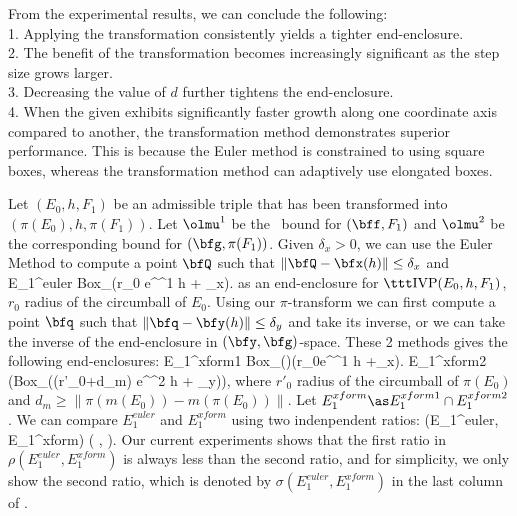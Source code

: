 {	From the experimental results, we can conclude the following:  
	\\ 1. Applying the transformation consistently yields a tighter
	end-enclosure.  
	\\ 2. The benefit of the transformation becomes increasingly
	significant as the step size grows larger.  
	\\ 3. Decreasing the value of $d$ further tightens the end-enclosure.  
	\\ 4. When the given \ivp exhibits significantly faster growth along
	one coordinate axis compared to another, the transformation method
	demonstrates superior performance. This is because the Euler method is
	constrained to using square boxes, whereas the transformation method
	can adaptively use elongated boxes.  


}
		Let $(E_0, h, F_1)$ be an admissible triple
	that has been transformed into $(\pi(E_0),h,\pi(F_1))$.
	Let $\olmu^1$ be the \lognorm\ bound for $(\bff,F_1)$
	and
	$\olmu^2$ be the corresponding bound for $(\bfg,\pi(F_1))$.
	Given $\delta_x>0$, we can use the Euler Method to
	compute a point $\bfQ$ such that 
	$\|\bfQ-\bfx(h)\|\le \delta_x$ and
	E_1^{euler} \as Box_\bfQ\left(r_0 e^{\olmu^1 h} 
	+ \delta_x\right). \eeql 
	as an end-enclosure for $\ivp(E_0,h,F_1)$, $r_0$ radius
	of the circumball of $E_0$.  Using our $\pi$-transform we can
	first compute a point $\bfq$ such that 
	$\|\bfq-\bfy(h)\|\le \delta_y$ 
	and take its inverse, or we can take the inverse of
	the end-enclosure in $(\bfy,\bfg)$-space.  These 2 methods gives
	the following end-enclosures:
	E_1^{xform1}
	\as Box_{\pi\inv(\bfq)}\left(r_0e^{\olmu^1 h} 
	+\delta_x\right).
	\eeql
	E_1^{xform2}
	\as \pi\inv\left(Box_{\bfq}((r'_0+d_m) e^{\olmu^2 h} 
	+  \delta_y)\right),
	\eeql
	where $r'_0$ radius of the circumball of 
	$\pi(E_0)$ and $d_m\ge \|\pi(m(E_0))-m(\pi(E_0))\|$.
	Let $E_1^{xform}\as E_1^{xform1}\cap E_1^{xform2}$. 
	We can compare $E_1^{euler}$ and $E_1^{xform}$ using two
	indenpendent ratios:
	\rho(E_1^{euler}, E_1^{xform}) \as 
	\Big( , 
	\Big).
	\eeql
	Our current experiments shows that the first ratio in 
	$\rho(E_1^{euler}, E_1^{xform})$ is always less than
	the second ratio, and for simplicity, we only show the
	second ratio, which is denoted by
	$\sigma(E_1^{euler}, E_1^{xform})$ in the
	last column of .
	
